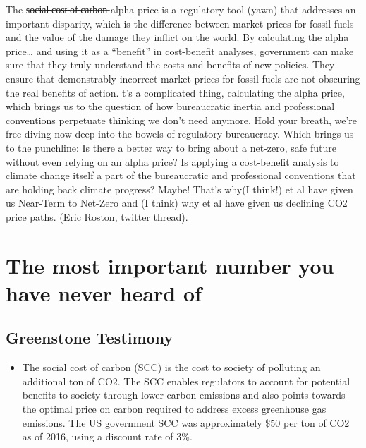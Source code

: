 \documentclass[
]{book}
\providecommand{\tightlist}{%
  \setlength{\itemsep}{0pt}\setlength{\parskip}{0pt}}
\begin{document}
The s̶o̶c̶i̶a̶l̶ ̶c̶o̶s̶t̶ ̶o̶f̶ ̶c̶a̶r̶b̶o̶n̶ alpha price is a regulatory tool (yawn) that addresses an important disparity, which is the difference between market prices for fossil fuels and the value of the damage they inflict on the world. By calculating the alpha price\ldots{}
and using it as a ``benefit'' in cost-benefit analyses, government can make sure that they truly understand the costs and benefits of new policies. They ensure that demonstrably incorrect market prices for fossil fuels are not obscuring the real benefits of action.
t's a complicated thing, calculating the alpha price, which brings us to the question of how bureaucratic inertia and professional conventions perpetuate thinking we don't need anymore.
Hold your breath, we're free-diving now deep into the bowels of regulatory bureaucracy.
Which brings us to the punchline: Is there a better way to bring about a net-zero, safe future without even relying on an alpha price? Is applying a cost-benefit analysis to climate change itself a part of the bureaucratic and professional conventions that are holding back climate progress? Maybe! That's why(I think!) \citet{noahqk} et al have given us Near-Term to Net-Zero and (I think) why \citet{GernotWagner}
et al have given us declining CO2 price paths.
(Eric Roston, twitter thread).

\hypertarget{the-most-important-number-you-have-never-heard-of}{%
\section{The most important number you have never heard of}\label{the-most-important-number-you-have-never-heard-of}}

\hypertarget{greenstone-testimony}{%
\subsection{Greenstone Testimony}\label{greenstone-testimony}}

\begin{itemize}
\tightlist
\item
  The social cost of carbon (SCC) is the cost to society of polluting an additional ton of CO2.
  The SCC enables regulators to account for potential benefits to society through lower carbon
  emissions and also points towards the optimal price on carbon required to address excess
  greenhouse gas emissions. The US government SCC was approximately \$50 per ton of CO2
  as of 2016, using a discount rate of 3\%.
\end{itemize}
\end{document}
